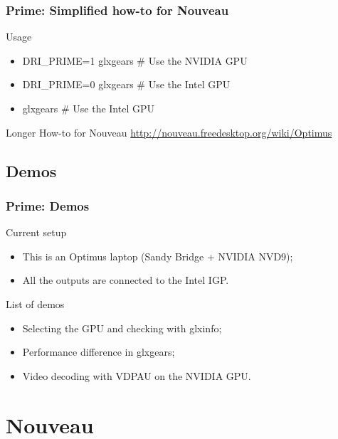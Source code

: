 \documentclass[11pt,english,compress]{beamer}
\begin{document}
\begin{frame}
	\frametitle{Prime: Simplified how-to for Nouveau}

	\begin{block}{Usage}
		\begin{itemize}
			\item DRI\_PRIME=1 glxgears \# Use the NVIDIA GPU
			\item DRI\_PRIME=0 glxgears \# Use the Intel GPU
			\item glxgears \# Use the Intel GPU
		\end{itemize}
	\end{block}

	\begin{block}{Longer How-to for Nouveau}
		\url{http://nouveau.freedesktop.org/wiki/Optimus}
	\end{block}
\end{frame}

\subsection{Demos}
\begin{frame}
	\frametitle{Prime: Demos}

	\begin{block}{Current setup}
		\begin{itemize}
			\item This is an Optimus laptop (Sandy Bridge + NVIDIA NVD9);
			\item All the outputs are connected to the Intel IGP.
		\end{itemize}
	\end{block}

	\begin{block}{List of demos}
		\begin{itemize}
			\item Selecting the GPU and checking with glxinfo;
			\item Performance difference in glxgears;
			\item Video decoding with VDPAU on the NVIDIA GPU.
		\end{itemize}
	\end{block}
\end{frame}


\section{Nouveau}
\end{document}
